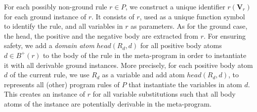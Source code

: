 \documentclass[11pt,fleqn,twoside]{article}
\renewcommand{\vec}[1]{\ensuremath{\mb{#1}}}
\newcommand{\mb}[1]{\ensuremath{\mathbf{#1}}}
\begin{document}
			For each possibly non-ground rule $r \in P$, we construct a unique identifier $r(\vec{V}_r)$ for each ground instance of $r$.
			It consists of $r$, used as a unique function symbol to identify the rule, and all variables in $r$ as parameters.
			As for the ground case, the head, the positive and the negative body are extracted from $r$.
			For ensuring safety, we add a \emph{domain atom} $\mathit{head}(R_d, d)$ for all positive body atoms $d \in B^{+}(r)$ to the body of the rule in the meta-program
			in order to instantiate it with all derivable ground instances.
			More precisely, for each positive body atom $d$ of the current rule,
			we use $R_d$ as a variable and add atom $\mathit{head}(R_d,d)$, to represents all (other) program rules of $P$ that instantiate the variables in atom $d$.
			This creates an instance of $r$ for all variable substitutions such that all body atoms of the instance are potentially derivable in the meta-program.
			
\end{document}
